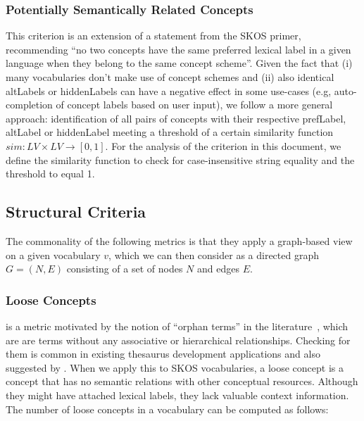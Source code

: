 \subsubsection{Potentially Semantically Related Concepts} 
This criterion is an extension of a statement from the SKOS primer, recommending ``no two concepts have the same preferred lexical label in a given language when they belong to the same concept scheme''. Given the fact that (i) many vocabularies don’t make use of concept schemes and (ii) also identical altLabels or hiddenLabels can have a negative effect in some use-cases (e.g, auto-completion of concept labels based on user input), we follow a more general approach: identification of all pairs of concepts with their respective prefLabel, altLabel or hiddenLabel meeting a threshold of a certain similarity function $sim:LV \times LV \rightarrow [0,1]$. For the analysis of the criterion in this document, we define the similarity function  to check for case-insensitive string equality and the threshold to equal 1.


\subsection{Structural Criteria}

The commonality of the following metrics is that they apply a graph-based view on a given vocabulary \(v\), which we can then consider as a directed graph \(G=(N,E)\) consisting of a set of nodes \(N\) and edges \(E\).

\subsubsection{Loose Concepts} is a metric motivated by the notion of ``orphan terms'' in the literature~\cite{Hedden2010}, which are are terms without any associative or hierarchical relationships. Checking for them is common in existing thesaurus development applications and also suggested by \cite{Z39.19:2005}. When we apply this to SKOS vocabularies, a loose concept is a concept that has no semantic relations with other conceptual resources. Although they might have attached lexical labels, they lack valuable context information. The number of loose concepts in a vocabulary can be computed as follows: 


